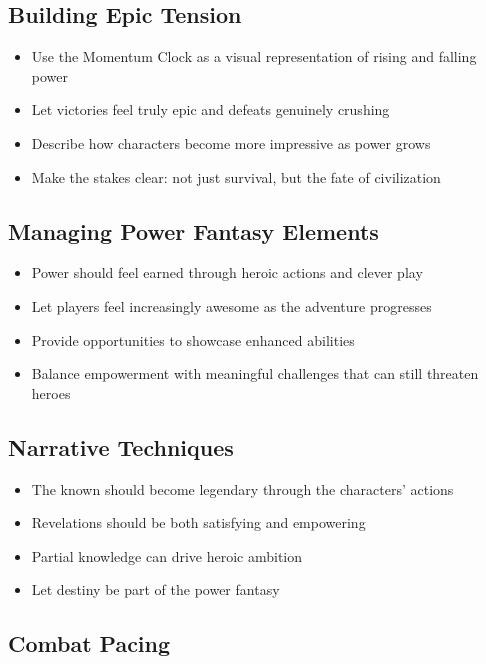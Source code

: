 \documentclass[12pt,twoside]{article}
\begin{document}
\subsection{Building Epic Tension}

\begin{itemize}
  \item Use the Momentum Clock as a visual representation of rising and falling power
  \item Let victories feel truly epic and defeats genuinely crushing
  \item Describe how characters become more impressive as power grows
  \item Make the stakes clear: not just survival, but the fate of civilization
\end{itemize}

\subsection{Managing Power Fantasy Elements}

\begin{itemize}
  \item Power should feel earned through heroic actions and clever play
  \item Let players feel increasingly awesome as the adventure progresses
  \item Provide opportunities to showcase enhanced abilities
  \item Balance empowerment with meaningful challenges that can still threaten heroes
\end{itemize}

\subsection{Narrative Techniques}

\begin{itemize}
  \item The known should become legendary through the characters' actions
  \item Revelations should be both satisfying and empowering
  \item Partial knowledge can drive heroic ambition
  \item Let destiny be part of the power fantasy
\end{itemize}

\subsection{Combat Pacing}
\end{document}
